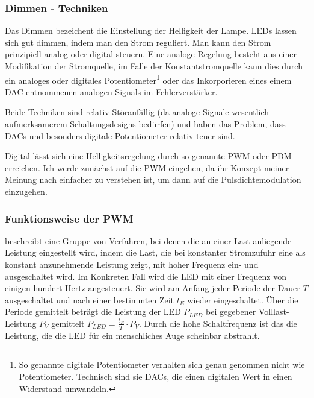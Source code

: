 \documentclass[12pt,a4paper,notitlepage]{article}
\begin{document}
\subsubsection{Dimmen - Techniken}
Das Dimmen bezeichent die Einstellung der Helligkeit der Lampe. \glspl{LED} lassen sich gut dimmen, indem man den Strom reguliert. Man kann den Strom prinzipiell analog oder digital steuern. Eine analoge Regelung besteht aus einer Modifikation der Stromquelle, im Falle der Konstantstromquelle kann dies durch ein analoges oder digitales Potentiometer\footnote{So genannte digitale Potentiometer verhalten sich genau genommen nicht wie Potentiometer. Technisch sind sie \glspl{DAC}, die einen digitalen Wert in einen Widerstand umwandeln.} oder das Inkorporieren eines einem \gls{DAC} entnommenen analogen Signals im Fehlerverstärker.

Beide Techniken sind relativ Störanfällig (da analoge Signale wesentlich aufmerksamerem Schaltungsdesigns bedürfen) und haben das Problem, dass \glspl{DAC} und besonders digitale Potentiometer relativ teuer sind.

Digital lässt sich eine Helligkeitsregelung durch so genannte \gls{PWM} oder \gls{PDM} erreichen. Ich werde zunächst auf die \gls{PWM} eingehen, da ihr Konzept meiner Meinung nach einfacher zu verstehen ist, um dann auf die Pulsdichtemodulation einzugehen.

\subsubsection{Funktionsweise der PWM}
 beschreibt eine Gruppe von Verfahren, bei denen die an einer Last anliegende Leistung eingestellt wird, indem die Last, die bei konstanter Stromzufuhr eine als konstant anzunehmende Leistung zeigt, mit hoher Frequenz ein- und ausgeschaltet wird. Im Konkreten Fall wird die \gls{LED} mit einer Frequenz von einigen hundert \gls{Hertz} angesteuert. Sie wird am Anfang jeder Periode der Dauer $T$ ausgeschaltet und nach einer bestimmten Zeit $t_E$ wieder eingeschaltet. Über die Periode gemittelt beträgt die Leistung der \gls{LED} $P_{LED}$ bei gegebener Volllast-Leistung $P_V$ gemittelt $P_{LED}=\frac{t_E}{T}\cdot P_{V}$. Durch die hohe Schaltfrequenz ist das die Leistung, die die \gls{LED} für ein menschliches Auge scheinbar abstrahlt.
\end{document}
